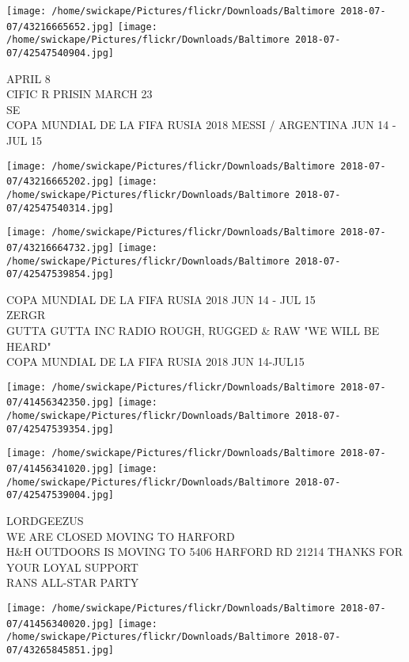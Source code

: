 \documentclass[10pt,letterpaper]{article}
\begin{document}
\texttt{[image: /home/swickape/Pictures/flickr/Downloads/Baltimore 2018-07-07/43216665652.jpg]}
\texttt{[image: /home/swickape/Pictures/flickr/Downloads/Baltimore 2018-07-07/42547540904.jpg]}

APRIL 8\\
CIFIC R PRISIN MARCH 23\\
SE\\
COPA MUNDIAL DE LA FIFA RUSIA 2018 MESSI / ARGENTINA JUN 14 {-} JUL 15\\
\pagebreak

\texttt{[image: /home/swickape/Pictures/flickr/Downloads/Baltimore 2018-07-07/43216665202.jpg]}
\texttt{[image: /home/swickape/Pictures/flickr/Downloads/Baltimore 2018-07-07/42547540314.jpg]}

\texttt{[image: /home/swickape/Pictures/flickr/Downloads/Baltimore 2018-07-07/43216664732.jpg]}
\texttt{[image: /home/swickape/Pictures/flickr/Downloads/Baltimore 2018-07-07/42547539854.jpg]}

COPA MUNDIAL DE LA FIFA RUSIA 2018 JUN 14 {-} JUL 15\\
ZERGR\\
GUTTA GUTTA INC RADIO ROUGH, RUGGED \& RAW "WE WILL BE HEARD"\\
COPA MUNDIAL DE LA FIFA RUSIA 2018 JUN 14{-}JUL15\\
\pagebreak

\texttt{[image: /home/swickape/Pictures/flickr/Downloads/Baltimore 2018-07-07/41456342350.jpg]}
\texttt{[image: /home/swickape/Pictures/flickr/Downloads/Baltimore 2018-07-07/42547539354.jpg]}

\texttt{[image: /home/swickape/Pictures/flickr/Downloads/Baltimore 2018-07-07/41456341020.jpg]}
\texttt{[image: /home/swickape/Pictures/flickr/Downloads/Baltimore 2018-07-07/42547539004.jpg]}

LORDGEEZUS\\
WE ARE CLOSED MOVING TO HARFORD\\
H\&H OUTDOORS IS MOVING TO 5406 HARFORD RD 21214 THANKS FOR YOUR LOYAL SUPPORT\\
RANS ALL{-}STAR PARTY\\
\pagebreak

\texttt{[image: /home/swickape/Pictures/flickr/Downloads/Baltimore 2018-07-07/41456340020.jpg]}
\texttt{[image: /home/swickape/Pictures/flickr/Downloads/Baltimore 2018-07-07/43265845851.jpg]}
\end{document}
